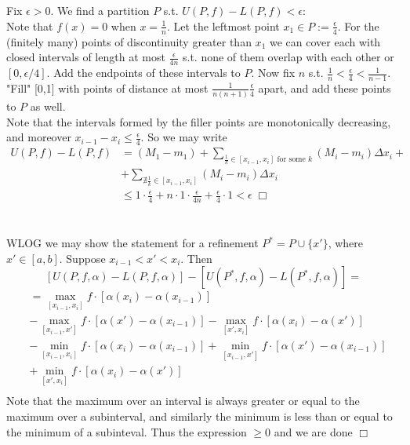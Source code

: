 \documentclass{article}
\begin{document}
\section{}
Fix $\epsilon > 0$. We find a partition $P$ s.t. $U(P,f) - L(P,f) < \epsilon$:\\
Note that $f(x) = 0$ when $x = \frac{1}{n}$. Let the leftmost point $x_1 \in P := \frac{\epsilon}{4}$. For the (finitely many) points of discontinuity greater than $x_1$ we can cover each with closed intervals of length at most $\frac{\epsilon}{4n}$ s.t. none of them overlap with each other or $[0,\epsilon/4]$. Add the endpoints of these intervals to $P$. Now fix $n$ s.t. $\frac{1}{n} < \frac{\epsilon}{4} < \frac{1}{n-1}$. "Fill" [0,1] with points of distance at most $\frac{1}{n(n+1)}\frac{\epsilon}{4}$ apart, and add these points to $P$ as well.\\
Note that the intervals formed by the filler points are monotonically decreasing, and moreover $x_{i-1} - x_i \leq \frac{\epsilon}{4}$. So we may write 
\begin{equation*}
	\begin{split}
	U(P,f) - L(P,f) &= (M_1-m_1) + \sum\limits_{\frac{1}{k} \in [x_{i-1},x_i] \text{ for some } k} (M_i - m_i)\Delta x_i +\\
	&+ \sum\limits_{\nexists \frac{1}{k} \in [x_{i-1},x_i]} (M_i - m_i)\Delta x_i\\
	&\leq 1\cdot\frac{\epsilon}{4} + n\cdot1\cdot\frac{\epsilon}{4n} + \frac{\epsilon}{4}\cdot 1 < \epsilon \; \Box
	\end{split}
\end{equation*}

\section{}
\subsection{}
WLOG we may show the statement for a refinement $P^* = P \cup \{x'\}$, where $x' \in [a,b]$. Suppose $x_{i-1} < x' < x_i$. Then
$$[U(P,f,\alpha) - L(P,f,\alpha)] - [U(P^*,f,\alpha) - L(P^*,f,\alpha)] = $$
\begin{equation*}
	\begin{split}
	&= \max\limits_{[x_{i-1},x_i]} f \cdot [\alpha(x_i) - \alpha(x_{i-1})]\\
	&- \max\limits_{[x_{i-1},x']} f \cdot [\alpha(x') - \alpha(x_{i-1})] - \max\limits_{[x',x_i]} f \cdot [\alpha(x_i) - \alpha(x')]\\
	&- \min\limits_{[x_{i-1},x_i]} f \cdot [\alpha(x_i) - \alpha(x_{i-1})] + \min\limits_{[x_{i-1},x']} f \cdot [\alpha(x') - \alpha(x_{i-1})]\\
	&+ \min\limits_{[x',x_i]} f \cdot [\alpha(x_i) - \alpha(x')]\\
	\end{split}
\end{equation*}
Note that the maximum over an interval is always greater or equal to the maximum over a subinterval, and similarly the minimum is less than or equal to the minimum of a subinteval. Thus the expression $\geq 0$ and we are done $\Box$
\end{document}
